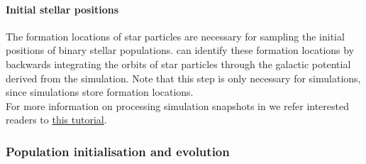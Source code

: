 \documentclass[twocolumn, twocolappendix, oneside]{aastex631}
\newcommand{\tutorialLink}[2]{\href{#1}{{\color{codecolour}#2}}}
\begin{document}
\paragraph{Initial stellar positions} The formation locations of star particles are necessary for sampling the initial positions of binary stellar populations. \cogsworth can identify these formation locations by backwards integrating the orbits of star particles through the galactic potential derived from the simulation. Note that this step is only necessary for \fire simulations, since \changa simulations store formation locations.\\

\noindent For more information on processing simulation snapshots in \cogsworth we refer interested readers to \tutorialLink{https://cogsworth.readthedocs.io/en/latest/tutorials/hydro/prep.html}{this tutorial}.

\subsubsection{Population initialisation and evolution}
\end{document}

